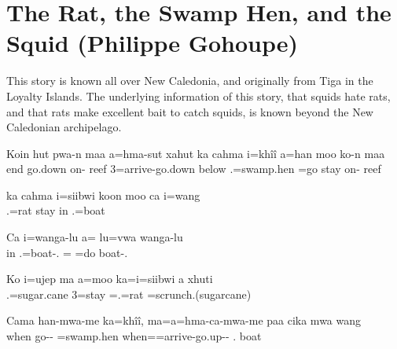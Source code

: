 \chapter{The Rat, the Swamp Hen, and the Squid (Philippe Gohoupe)}
\label{text:squid2}
This story is known all over New Caledonia, and originally from Tiga in the Loyalty Islands. The underlying information of this story, that squids hate rats, and that rats make excellent bait to catch squids, is known beyond the New Caledonian archipelago.\largerpage[2]

\ea%

\gll Koin hut pwa-n maa a=hma-sut xahut ka cahma i=khîî a=han moo ko-n maa\\ 
end go.down on- reef 3=arrive-go.down below   .=swamp.hen =go stay on- reef\\ 
\glt {}

\z
\ea%

\gll ka cahma i=siibwi koon moo ca i=wang\\ 
  .=rat  stay in .=boat\\ 
\glt {}

\z
\ea%

\gll Ca i=wanga-lu a= lu=vwa wanga-lu
\\ in .=boat-. = =do boat-.
\\ \glt {}

\z
\ea%

\gll Ko i=ujep ma a=moo ka=i=siibwi a xhuti\\ 
 .=sugar.cane  3=stay =.=rat =scrunch.(sugarcane)\\ 
\glt {}
\z

\ea%
\gll Cama han-mwa-me ka=khîî, ma=a=hma-ca-mwa-me paa cika mwa wang\\ 
when go-- =swamp.hen when==arrive-go.up--  .  boat\\ 
\glt {}

